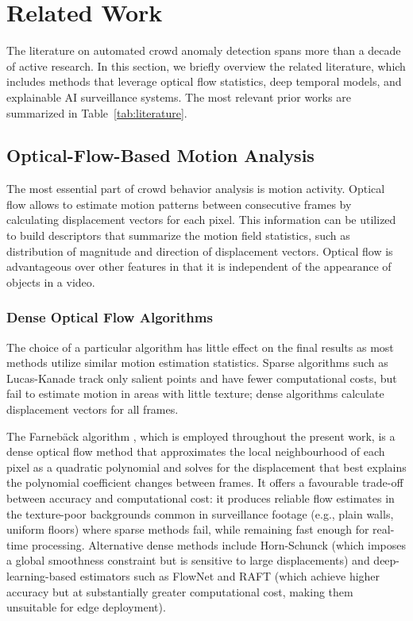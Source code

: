\section{Related Work}

The literature on automated crowd anomaly detection spans more than a decade of active research. In this section, we briefly overview the related literature, which includes methods that leverage optical flow statistics, deep temporal models, and explainable AI surveillance systems. The most relevant prior works are summarized in Table~\ref{tab:literature}.

\subsection{Optical-Flow-Based Motion Analysis}

The most essential part of crowd behavior analysis is motion activity. Optical flow allows to estimate motion patterns between consecutive frames by calculating displacement vectors for each pixel. This information can be utilized to build descriptors that summarize the motion field statistics, such as distribution of magnitude and direction of displacement vectors. Optical flow is advantageous over other features in that it is independent of the appearance of objects in a video.

\subsubsection{Dense Optical Flow Algorithms}
The choice of a particular algorithm has little effect on the final results as most methods utilize similar motion estimation statistics. Sparse algorithms such as Lucas-Kanade track only salient points and have fewer computational costs, but fail to estimate motion in areas with little texture; dense algorithms calculate displacement vectors for all frames.

The Farneb\"{a}ck algorithm \cite{farneback2003two}, which is employed throughout the present work, is a dense optical flow method that approximates the local neighbourhood of each pixel as a quadratic polynomial and solves for the displacement that best explains the polynomial coefficient changes between frames. It offers a favourable trade-off between accuracy and computational cost: it produces reliable flow estimates in the texture-poor backgrounds common in surveillance footage (e.g., plain walls, uniform floors) where sparse methods fail, while remaining fast enough for real-time processing. Alternative dense methods include Horn-Schunck (which imposes a global smoothness constraint but is sensitive to large displacements) and deep-learning-based estimators such as FlowNet and RAFT (which achieve higher accuracy but at substantially greater computational cost, making them unsuitable for edge deployment).

